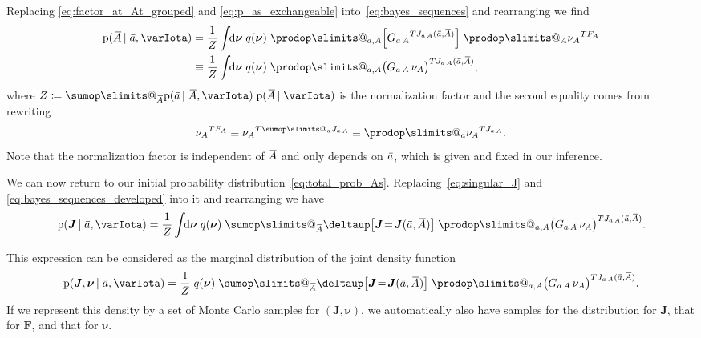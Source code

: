 \documentclass[\ifafour a4paper,12pt,\else a5paper,10pt,\fi%
onecolumn,oneside,article,%
british%
]{memoir}
\makeatletter
\theoremstyle{remark}
\theoremstyle{innote}
\def\sum{\DOTSI\sumop\slimits@}
\def\prod{\DOTSI\prodop\slimits@}
\newcommand*{\delt}{\deltaup}%
\newcommand*{\di}{\mathrm{d}}%
\newcommand*{\defd}{\coloneqq}
\newcommand*{\pf}{\mathrm{p}}%
\renewcommand*{\|}[1][]{\nonscript\,#1\vert\nonscript\;\mathopen{}}
\newcommand*{\widebar}[1]{{\mkern1.5mu\skew{2}\overline{\mkern-1.5mu#1\mkern-1.5mu}\mkern 1.5mu}}
\newcommand*{\yFF}{F}
\newcommand*{\yF}{\bm{\yFF}}
\newcommand*{\yAs}{\widebar{A}}%
\newcommand*{\yas}{\widebar{a}}%
\newcommand*{\ynuu}{\nu}
\newcommand*{\ynu}{\bm{\ynuu}}
\newcommand*{\yeq}{\mathrel{\!=\!}}
\newcommand*{\yJJ}{J}
\newcommand*{\yJ}{\bm{\yJJ}}
\newcommand*{\yI}{\varIota}
\makeatother
\begin{document}
\medskip

Replacing \eqref{eq:factor_at_At_grouped} and \eqref{eq:p_as_exchangeable}
into~\eqref{eq:bayes_sequences} and rearranging we find
\begin{equation}
  \label{eq:bayes_sequences_developed}
  \begin{split}
  \pf(\yAs \| \yas, \yI) &= \frac{1}{Z}
  \int\!\!\di\ynu\;q(\ynu)\; %
  \prod_{a,A} \Bigl[{G_{a\,A}}^{T J_{a\,A}(\yas,\yAs)}\Bigr]
  \;\prod_{A}{\nu_{A}}^{T F_{A}}
  \\
  &\equiv
  \frac{1}{Z}
  \int\!\!\di\ynu\;q(\ynu)\; %
  \prod_{a,A} \bigl(G_{a\,A}\,\nu_{A}\bigr)^{T J_{a\,A}(\yas,\yAs)},
\end{split}
\end{equation}
where $Z\defd \sum_{\yAs}\pf(\yas \| \yAs, \yI)\;\pf(\yAs \| \yI)$ is the
normalization factor and the second equality comes from rewriting
\begin{equation}
  \label{eq:rewrite_nu_power}
  {\nu_{A}}^{T F_{A}} \equiv {\nu_{A}}^{T \sum_{a}J_{a\,A}}
  \equiv \prod_{a}{\nu_{A}}^{T J_{a\,A}}.
\end{equation}
Note that the normalization factor is independent of $\yAs$ and only
depends on $\yas$, which is given and fixed in our inference.

\bigskip

We can now return to our initial probability
distribution~\eqref{eq:total_prob_As}. Replacing~\eqref{eq:singular_J} and
\eqref{eq:bayes_sequences_developed} into it and rearranging we have
\begin{equation}
  \label{eq:next-final_expression}
    \pf(\yJ \| \yas, \yI) =
  \frac{1}{Z}
  \int\!\!\di\ynu\;q(\ynu)\;
  \sum_{\yAs}\delt\bigl[\yJ \yeq \yJ(\yas,\yAs)\bigr]\;
  \prod_{a,A} \bigl(G_{a\,A}\,\nu_{A}\bigr)^{T J_{a\,A}(\yas,\yAs)}.
\end{equation}

This expression can be considered as the marginal distribution of the joint
density function
\begin{equation}
  \label{eq:joint_q_J_almost-final}
      \pf(\yJ, \ynu\| \yas, \yI) =
  \frac{1}{Z}\;
  q(\ynu)\;
  \sum_{\yAs}\delt\bigl[\yJ \yeq \yJ(\yas,\yAs)\bigr]\;
  \prod_{a,A} \bigl(G_{a\,A}\,\nu_{A}\bigr)^{T J_{a\,A}(\yas,\yAs)}.
\end{equation}
If we represent this density by a set of Monte Carlo samples for
$(\yJ,\ynu)$, we automatically also have samples for the distribution for
$\yJ$, that for $\yF$, and that for $\ynu$.
\end{document}
